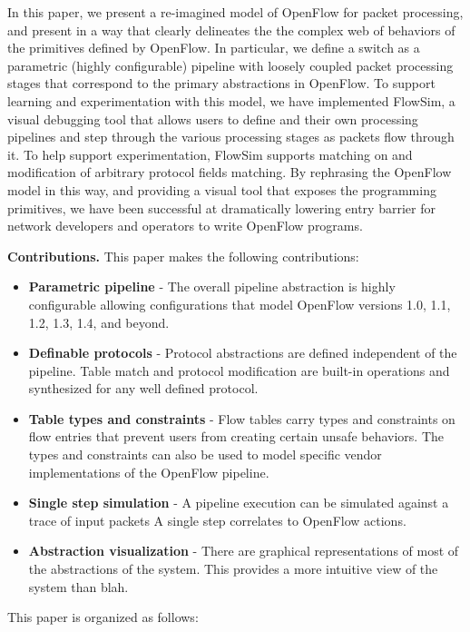 In this paper, we present a re-imagined model of OpenFlow for
packet processing, and present in a way that clearly delineates the
the complex web of behaviors of the primitives defined by OpenFlow.
In particular, we define a switch as a parametric (highly configurable)
pipeline with loosely coupled packet processing stages that correspond
to the primary abstractions in OpenFlow.
To support learning and experimentation with this model, we have 
implemented FlowSim, a visual debugging tool that allows users to
define and their own processing pipelines and step through the
various processing stages as packets flow through it. To help support
experimentation, FlowSim supports matching on and modification of arbitrary 
protocol fields matching.
By rephrasing the OpenFlow model in this way, and providing a visual
tool that exposes the programming primitives, we have been successful
at dramatically lowering entry barrier for network developers and
operators to write OpenFlow programs.


\textbf{Contributions.} This paper makes the following contributions:
\begin{itemize}
  \item \textbf{Parametric pipeline} - The overall pipeline abstraction is
        highly configurable allowing configurations that model OpenFlow 
        versions 1.0, 1.1, 1.2, 1.3, 1.4, and beyond.
  \item \textbf{Definable protocols} - Protocol abstractions are defined 
        independent of the pipeline. Table match and protocol modification are
        built-in operations and synthesized for any well defined protocol.
  \item \textbf{Table types and constraints} - Flow tables carry types and
        constraints on flow entries that prevent users from creating certain
        unsafe behaviors. The types and constraints can also be used to model
        specific vendor implementations of the OpenFlow pipeline.
  \item \textbf{Single step simulation} - A pipeline execution can be simulated
        against a trace of input packets A single step correlates to OpenFlow
        actions.
  \item \textbf{Abstraction visualization} - There are graphical representations
        of most of the abstractions of the system. This provides a more intuitive
        view of the system than blah.
\end{itemize}

This paper is organized as follows:
